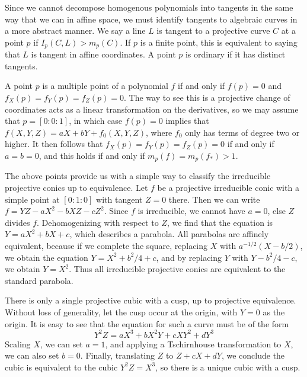 \begin{example}
    Since we cannot decompose homogenous polynomials into tangents in the same way that we can in affine space, we must identify tangents to algebraic curves in a more abstract manner. We say a line $L$ is tangent to a projective curve $C$ at a point $p$ if $I_p(C,L) > m_p(C)$. If $p$ is a finite point, this is equivalent to saying that $L$ is tangent in affine coordinates. A point $p$ is ordinary if it has distinct tangents.
\end{example}

\begin{example}
    A point $p$ is a multiple point of a polynomial $f$ if and only if $f(p) = 0$ and $f_X(p) = f_Y(p) = f_Z(p) = 0$. The way to see this is a projective change of coordinates acts as a linear transformation on the derivatives, so we may assume that $p = [0:0:1]$, in which case $f(p) = 0$ implies that $f(X,Y,Z) = aX + bY + f_0(X,Y,Z)$, where $f_0$ only has terms of degree two or higher. It then follows that $f_X(p) = f_Y(p) = f_Z(p) = 0$ if and only if $a = b = 0$, and this holds if and only if $m_p(f) = m_p(f_*) > 1$.
\end{example}

\begin{example}
    The above points provide us with a simple way to classify the irreducible projective conics up to equivalence. Let $f$ be a projective irreducible conic with a simple point at $[0:1:0]$ with tangent $Z = 0$ there. Then we can write $f = YZ - aX^2 - bXZ - cZ^2$. Since $f$ is irreducible, we cannot have $a = 0$, else $Z$ divides $f$. Dehomogenizing with respect to $Z$, we find that the equation is $Y = aX^2 + bX + c$, which describes a parabola. All parabolas are affinely equivalent, because if we complete the square, replacing $X$ with $a^{-1/2}(X - b/2)$, we obtain the equation $Y = X^2 + b^2/4 + c$, and by replacing $Y$ with $Y - b^2/4 - c$, we obtain $Y = X^2$. Thus all irreducible projective conics are equivalent to the standard parabola.
\end{example}

\begin{example}
    There is only a single projective cubic with a cusp, up to projective equivalence. Without loss of generality, let the cusp occur at the origin, with $Y = 0$ as the origin. It is easy to see that the equation for such a curve must be of the form
    \[ Y^2Z = aX^3 + bX^2Y + cXY^2 + dY^3 \]
    Scaling $X$, we can set $a = 1$, and applying a Tschirnhouse transformation to $X$, we can also set $b = 0$. Finally, translating $Z$ to $Z + cX + dY$, we conclude the cubic is equivalent to the cubic $Y^2Z = X^3$, so there is a unique cubic with a cusp.
\end{example}

